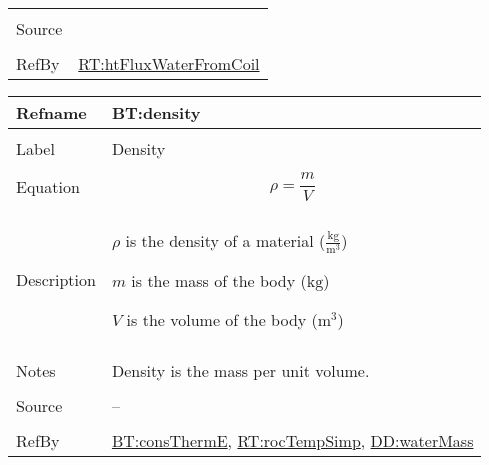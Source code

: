 \documentclass[12pt]{article}
\begin{document}
\begin{minipage}{\textwidth}
\begin{tabular}{>{\raggedright}p{}>{\raggedright\arraybackslash}p{}}
\\ \midrule \\
Source & \cite[(pg. 8)]{incroperaEtAl2007}
         
\\ \midrule \\
RefBy & \hyperref[RT:htFluxWaterFromCoil]{RT:htFluxWaterFromCoil}
        
\\ \bottomrule
\end{tabular}
\end{minipage}


\vspace{\baselineskip}
\noindent
\begin{minipage}{\textwidth}
\begin{tabular}{>{\raggedright}p{}>{\raggedright\arraybackslash}p{}}
\toprule \textbf{Refname} & \textbf{BT:density}
\label{BT:density}
\\ \midrule \\
Label & Density
        
\\ \midrule \\
Equation & \begin{displaymath}
           \rho = \frac {m} {V}
           \end{displaymath}
\\ \midrule \\
Description & \begin{symbDescription}
              \item{$\rho$ is the density of a material ($\frac{\text{kg}}{\text{m}^{3}}$)}
              \item{$m$ is the mass of the body (${\text{kg}}$)}
              \item{$V$ is the volume of the body (${\text{m}^{3}}$)}
              \end{symbDescription}
\\ \midrule \\
Notes & Density is the mass per unit volume.
        
\\ \midrule \\
Source & --
         
\\ \midrule \\
RefBy & \hyperref[BT:consThermE]{BT:consThermE},
\hyperref[RT:rocTempSimp]{RT:rocTempSimp}, \hyperref[DD:waterMass]{DD:waterMass}
        
\\ \bottomrule
\end{tabular}
\end{minipage}
\end{document}
